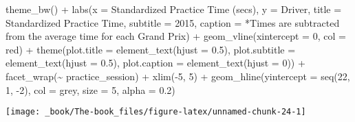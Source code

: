 \documentclass[
]{book}
\newenvironment{Shaded}{\begin{snugshade}}{\end{snugshade}}
\newcommand{\AttributeTok}[1]{\textcolor[rgb]{0.77,0.63,0.00}{#1}}
\newcommand{\DecValTok}[1]{\textcolor[rgb]{0.00,0.00,0.81}{#1}}
\newcommand{\FloatTok}[1]{\textcolor[rgb]{0.00,0.00,0.81}{#1}}
\newcommand{\FunctionTok}[1]{\textcolor[rgb]{0.00,0.00,0.00}{#1}}
\newcommand{\NormalTok}[1]{#1}
\newcommand{\SpecialCharTok}[1]{\textcolor[rgb]{0.00,0.00,0.00}{#1}}
\newcommand{\StringTok}[1]{\textcolor[rgb]{0.31,0.60,0.02}{#1}}
\begin{document}
\begin{Shaded}
\begin{Highlighting}[]
   \FunctionTok{theme\_bw}\NormalTok{() }\SpecialCharTok{+}
   \FunctionTok{labs}\NormalTok{(}\AttributeTok{x =} \StringTok{\textquotesingle{}Standardized Practice Time (secs)\textquotesingle{}}\NormalTok{,}
        \AttributeTok{y =} \StringTok{\textquotesingle{}Driver\textquotesingle{}}\NormalTok{,}
        \AttributeTok{title =} \StringTok{\textquotesingle{}Standardized Practice Time\textquotesingle{}}\NormalTok{,}
        \AttributeTok{subtitle =} \StringTok{\textquotesingle{}2015\textquotesingle{}}\NormalTok{,}
        \AttributeTok{caption =} \StringTok{\textquotesingle{}*Times are subtracted from the average time for each Grand Prix\textquotesingle{}}\NormalTok{) }\SpecialCharTok{+}
   \FunctionTok{geom\_vline}\NormalTok{(}\AttributeTok{xintercept =} \DecValTok{0}\NormalTok{, }\AttributeTok{col =} \StringTok{\textquotesingle{}red\textquotesingle{}}\NormalTok{) }\SpecialCharTok{+}
   \FunctionTok{theme}\NormalTok{(}\AttributeTok{plot.title =} \FunctionTok{element\_text}\NormalTok{(}\AttributeTok{hjust =} \FloatTok{0.5}\NormalTok{),}
         \AttributeTok{plot.subtitle =} \FunctionTok{element\_text}\NormalTok{(}\AttributeTok{hjust =} \FloatTok{0.5}\NormalTok{),}
         \AttributeTok{plot.caption =} \FunctionTok{element\_text}\NormalTok{(}\AttributeTok{hjust =} \DecValTok{0}\NormalTok{)) }\SpecialCharTok{+}
  \FunctionTok{facet\_wrap}\NormalTok{(}\SpecialCharTok{\textasciitilde{}}\NormalTok{ practice\_session) }\SpecialCharTok{+}
  \FunctionTok{xlim}\NormalTok{(}\SpecialCharTok{{-}}\DecValTok{5}\NormalTok{, }\DecValTok{5}\NormalTok{) }\SpecialCharTok{+}
  \FunctionTok{geom\_hline}\NormalTok{(}\AttributeTok{yintercept =} \FunctionTok{seq}\NormalTok{(}\DecValTok{22}\NormalTok{, }\DecValTok{1}\NormalTok{, }\SpecialCharTok{{-}}\DecValTok{2}\NormalTok{), }\AttributeTok{col =} \StringTok{\textquotesingle{}grey\textquotesingle{}}\NormalTok{, }\AttributeTok{size =} \DecValTok{5}\NormalTok{, }\AttributeTok{alpha =}  \FloatTok{0.2}\NormalTok{)}
\end{Highlighting}
\end{Shaded}

\begin{center}\texttt{[image: \_book/The-book\_files/figure-latex/unnamed-chunk-24-1]} \end{center}
\end{document}
